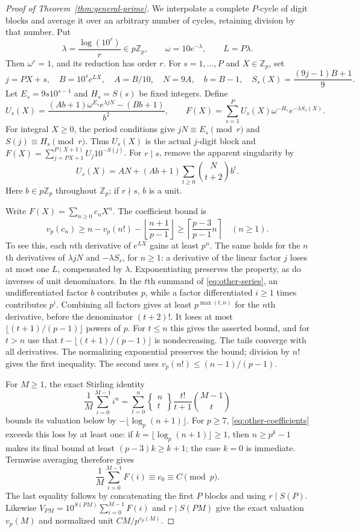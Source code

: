 \documentclass[10pt]{article}
\newcommand{\Z}{\mathbb Z}
\newcommand{\Stir}[2]{\left\{\begin{smallmatrix}#1\\#2\end{smallmatrix}\right\}}
\begin{document}
\begin{proof}[Proof of Theorem~\ref{thm:general-prime}]
We interpolate a complete $P$-cycle of digit blocks and average it over an
arbitrary number of cycles, retaining division by that number.
Put
\[
 \lambda=\frac{\log(10^r)}r\in p\Z_p,\qquad
 \omega=10e^{-\lambda},\qquad L=P\lambda.
\]
Then $\omega^r=1$, and its reduction has order $r$.
For $s=1,\ldots,P$ and $X\in\Z_p$, set
\[
 j=PX+s,\quad B=10^se^{LX},\quad A=B/10,\quad N=9A,\quad b=B-1,
 \quad S_s(X)=\frac{(9j-1)B+1}{9}.
\]
Let $E_s=9s10^{s-1}$ and $H_s=S(s)$ be fixed integers. Define
\[
 U_s(X)=\frac{(Ab+1)\omega^{E_s}e^{\lambda jN}-(Bb+1)}{b^2},
 \qquad
 F(X)=\sum_{s=1}^P U_s(X)\omega^{-H_s}e^{-\lambda S_s(X)}.
\]
For integral $X\ge0$, the period conditions give
$jN\equiv E_s\pmod r$ and $S(j)\equiv H_s\pmod r$.
Thus $U_s(X)$ is the actual $j$-digit block and
$F(X)=\sum_{j=PX+1}^{P(X+1)}U_j10^{-S(j)}$.
For $r\mid s$, remove the apparent singularity by
\begin{equation}\label{eq:other-series}
 U_s(X)=AN+(Ab+1)\sum_{t\ge0}\binom N{t+2}b^t.
\end{equation}
Here $b\in p\Z_p$ throughout $\Z_p$; if $r\nmid s$, $b$ is a unit.

Write $F(X)=\sum_{n\ge0}c_nX^n$. The coefficient bound is
\begin{equation}\label{eq:other-coefficients}
 v_p(c_n)\ge n-v_p(n!)-\left\lfloor\frac{n+1}{p-1}\right\rfloor
 \ge\left\lceil\frac{p-3}{p-1}n\right\rceil\quad(n\ge1).
\end{equation}
To see this, each $n$th derivative of $e^{LX}$ gains at least $p^n$.
The same holds for the $n$th derivatives of $\lambda jN$ and
$-\lambda S_s$, for $n\ge1$: a derivative of the linear factor $j$
loses at most one $L$, compensated by $\lambda$.
Exponentiating preserves the property, as do inverses of unit denominators.
In the $t$th summand of \eqref{eq:other-series}, an undifferentiated factor
$b$ contributes $p$, while a factor differentiated $i\ge1$ times contributes
$p^i$. Combining all factors gives at least $p^{\max(t,n)}$ for the $n$th
derivative, before the denominator $(t+2)!$.
It loses at most $\lfloor(t+1)/(p-1)\rfloor$ powers of $p$.
For $t\le n$ this gives the asserted bound, and for $t>n$ use that
$t-\lfloor(t+1)/(p-1)\rfloor$ is nondecreasing.
The tails converge with all derivatives.
The normalizing exponential preserves the bound; division by $n!$ gives
the first inequality. The second uses $v_p(n!)\le(n-1)/(p-1)$.

For $M\ge1$, the exact Stirling identity
\[
 \frac1M\sum_{i=0}^{M-1}i^n
 =\sum_{t=0}^n\Stir{n}{t}\frac{t!}{t+1}\binom{M-1}t
\]
bounds its valuation below by $-\lfloor\log_p(n+1)\rfloor$.
For $p\ge7$, \eqref{eq:other-coefficients} exceeds this loss by at least one:
if $k=\lfloor\log_p(n+1)\rfloor\ge1$, then $n\ge p^k-1$ makes its final
bound at least $(p-3)k\ge k+1$; the case $k=0$ is immediate.
Termwise averaging therefore gives
\[
 \frac1M\sum_{i=0}^{M-1}F(i)\equiv c_0\equiv C\pmod p.
\]
The last equality follows by concatenating the first $P$ blocks and using
$r\mid S(P)$. Likewise
$V_{PM}=10^{S(PM)}\sum_{i=0}^{M-1}F(i)$ and $r\mid S(PM)$
give the exact valuation $v_p(M)$ and normalized unit $CM/p^{v_p(M)}$.


\end{proof}
\end{document}
